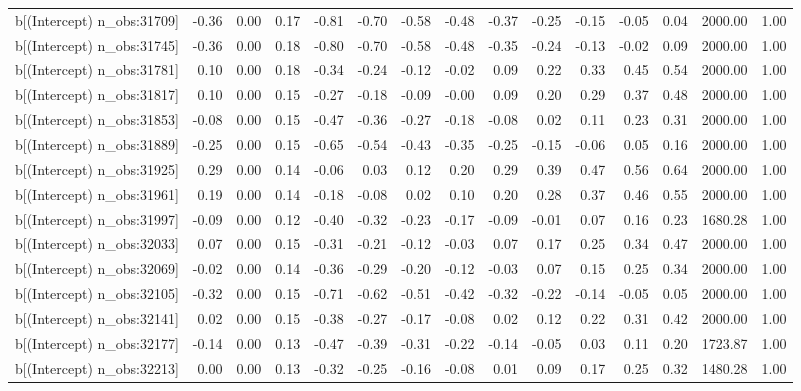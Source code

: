 \begin{table}[ht]
\begin{tabular}{rrrrrrrrrrrrrrr}
  b[(Intercept) n\_obs:31709] & -0.36 & 0.00 & 0.17 & -0.81 & -0.70 & -0.58 & -0.48 & -0.37 & -0.25 & -0.15 & -0.05 & 0.04 & 2000.00 & 1.00 \\ 
  b[(Intercept) n\_obs:31745] & -0.36 & 0.00 & 0.18 & -0.80 & -0.70 & -0.58 & -0.48 & -0.35 & -0.24 & -0.13 & -0.02 & 0.09 & 2000.00 & 1.00 \\ 
  b[(Intercept) n\_obs:31781] & 0.10 & 0.00 & 0.18 & -0.34 & -0.24 & -0.12 & -0.02 & 0.09 & 0.22 & 0.33 & 0.45 & 0.54 & 2000.00 & 1.00 \\ 
  b[(Intercept) n\_obs:31817] & 0.10 & 0.00 & 0.15 & -0.27 & -0.18 & -0.09 & -0.00 & 0.09 & 0.20 & 0.29 & 0.37 & 0.48 & 2000.00 & 1.00 \\ 
  b[(Intercept) n\_obs:31853] & -0.08 & 0.00 & 0.15 & -0.47 & -0.36 & -0.27 & -0.18 & -0.08 & 0.02 & 0.11 & 0.23 & 0.31 & 2000.00 & 1.00 \\ 
  b[(Intercept) n\_obs:31889] & -0.25 & 0.00 & 0.15 & -0.65 & -0.54 & -0.43 & -0.35 & -0.25 & -0.15 & -0.06 & 0.05 & 0.16 & 2000.00 & 1.00 \\ 
  b[(Intercept) n\_obs:31925] & 0.29 & 0.00 & 0.14 & -0.06 & 0.03 & 0.12 & 0.20 & 0.29 & 0.39 & 0.47 & 0.56 & 0.64 & 2000.00 & 1.00 \\ 
  b[(Intercept) n\_obs:31961] & 0.19 & 0.00 & 0.14 & -0.18 & -0.08 & 0.02 & 0.10 & 0.20 & 0.28 & 0.37 & 0.46 & 0.55 & 2000.00 & 1.00 \\ 
  b[(Intercept) n\_obs:31997] & -0.09 & 0.00 & 0.12 & -0.40 & -0.32 & -0.23 & -0.17 & -0.09 & -0.01 & 0.07 & 0.16 & 0.23 & 1680.28 & 1.00 \\ 
  b[(Intercept) n\_obs:32033] & 0.07 & 0.00 & 0.15 & -0.31 & -0.21 & -0.12 & -0.03 & 0.07 & 0.17 & 0.25 & 0.34 & 0.47 & 2000.00 & 1.00 \\ 
  b[(Intercept) n\_obs:32069] & -0.02 & 0.00 & 0.14 & -0.36 & -0.29 & -0.20 & -0.12 & -0.03 & 0.07 & 0.15 & 0.25 & 0.34 & 2000.00 & 1.00 \\ 
  b[(Intercept) n\_obs:32105] & -0.32 & 0.00 & 0.15 & -0.71 & -0.62 & -0.51 & -0.42 & -0.32 & -0.22 & -0.14 & -0.05 & 0.05 & 2000.00 & 1.00 \\ 
  b[(Intercept) n\_obs:32141] & 0.02 & 0.00 & 0.15 & -0.38 & -0.27 & -0.17 & -0.08 & 0.02 & 0.12 & 0.22 & 0.31 & 0.42 & 2000.00 & 1.00 \\ 
  b[(Intercept) n\_obs:32177] & -0.14 & 0.00 & 0.13 & -0.47 & -0.39 & -0.31 & -0.22 & -0.14 & -0.05 & 0.03 & 0.11 & 0.20 & 1723.87 & 1.00 \\ 
  b[(Intercept) n\_obs:32213] & 0.00 & 0.00 & 0.13 & -0.32 & -0.25 & -0.16 & -0.08 & 0.01 & 0.09 & 0.17 & 0.25 & 0.32 & 1480.28 & 1.00 \\ 

\end{tabular}
\end{table}
